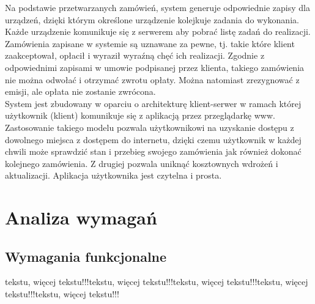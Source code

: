 \documentclass[10pt,a4paper,titlepage]{article} %
\begin{document}
		Na podstawie przetwarzanych zamówień, system generuje odpowiednie zapisy
		dla urządzeń, dzięki którym określone urządzenie kolejkuje zadania do
		wykonania. Każde urządzenie komunikuje się z serwerem aby pobrać listę
		zadań do realizacji. Zamówienia zapisane w systemie są uznawane za pewne,
		tj. takie które klient zaakceptował, opłacił i wyraził wyraźną chęć ich realizacji.
		Zgodnie z odpowiednimi zapisami w umowie podpisanej przez klienta, takiego
		zamówienia nie można odwołać i otrzymać zwrotu opłaty. Można natomiast zrezygnować
		z emisji, ale opłata nie zostanie zwrócona.\\
		
		System jest zbudowany w oparciu o architekturę klient-serwer w ramach
		której użytkownik (klient) komunikuje się z aplikacją przez przeglądarkę
		www. Zastosowanie takiego modelu pozwala użytkownikowi na uzyskanie dostępu
		z dowolnego miejsca z dostępem do internetu, dzięki czemu użytkownik w każdej
		chwili może sprawdzić stan i przebieg swojego zamówienia jak również dokonać
		kolejnego zamówienia. Z drugiej pozwala uniknąć kosztownych wdrożeń i aktualizacji.
		Aplikacja użytkownika jest czytelna i prosta.\\

	\section{Analiza wymagań}
		\subsection{Wymagania funkcjonalne}
		    tekstu, więcej tekstu!!!tekstu, więcej tekstu!!!tekstu, więcej tekstu!!!tekstu, więcej tekstu!!!tekstu, więcej tekstu!!!
\end{document}
